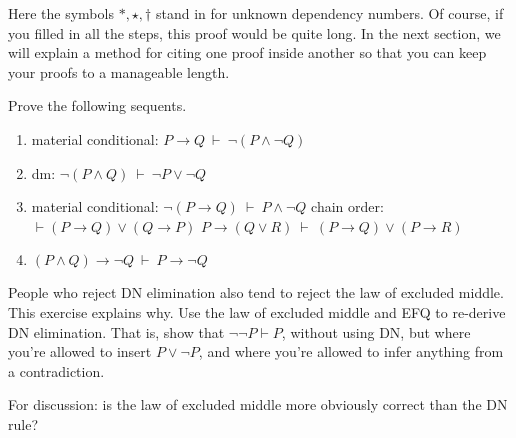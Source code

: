 Here the symbols $\ast ,\star ,\dagger$ stand in for unknown
dependency numbers.  Of course, if you filled in all the steps, this
proof would be quite long.  In the next section, we will explain a
method for citing one proof inside another so that you can keep your
proofs to a manageable length.

\begin{exercises} Prove the following sequents.
\begin{enumerate}
\item material conditional: $P\to Q\:\vdash\: \neg (P\wedge \neg Q)$  
\item \gls{dm}: $\neg (P\wedge Q)\:\vdash\: \neg P\vee \neg Q$
\item material conditional: $\neg (P\to Q)\:\vdash\: P\wedge \neg Q$     
\sitem chain order: $\vdash (P\to Q)\vee (Q\to P)$
\sitem $P\to (Q\vee R)\:\vdash\: (P\to Q)\vee (P\to R)$
\item $(P\wedge Q)\to \neg Q\:\vdash\:P\to \neg Q$
\end{enumerate}  

\begin{exercise} People who reject DN elimination also tend to reject
  the law of excluded middle.  This exercise explains why.  Use the
  law of excluded middle and EFQ to re-derive DN elimination.  That
  is, show that $\neg\neg P\vdash P$, without using DN, but where
  you're allowed to insert $P\vee\neg P$, and where you're allowed to
  infer anything from a contradiction.

  For discussion: is the law of excluded middle more obviously correct
  than the DN rule?
\end{exercise}



\end{exercises}


